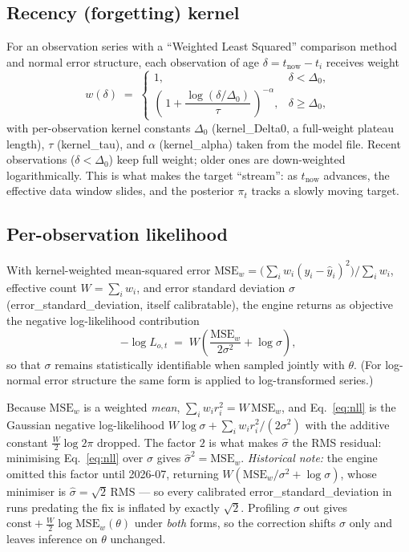 \documentclass[11pt]{article}
\newcommand{\param}[1]{\textsf{#1}}
\begin{document}
\subsection{Recency (forgetting) kernel}
For an observation series with a ``Weighted Least Squared'' comparison
method and normal error structure, each observation of age
$\delta = t_{\text{now}} - t_i$ receives weight
\begin{equation}
  w(\delta) \;=\;
  \begin{cases}
    1, & \delta < \Delta_0,\\[4pt]
    \left(\,1 + \dfrac{\log(\delta/\Delta_0)}{\tau}\,\right)^{-\alpha},
      & \delta \ge \Delta_0,
  \end{cases}
  \label{eq:kernel}
\end{equation}
with per-observation kernel constants $\Delta_0$
(\param{kernel\_Delta0}, a full-weight plateau length), $\tau$
(\param{kernel\_tau}), and $\alpha$ (\param{kernel\_alpha}) taken from
the model file. Recent observations ($\delta<\Delta_0$) keep full
weight; older ones are down-weighted logarithmically. This is what makes
the target ``stream'': as $t_{\text{now}}$ advances, the effective data
window slides, and the posterior $\pi_t$ tracks a slowly moving target.

\subsection{Per-observation likelihood}
With kernel-weighted mean-squared error
$\mathrm{MSE}_w = \big(\sum_i w_i (y_i-\hat y_i)^2\big)/\sum_i w_i$,
effective count $W=\sum_i w_i$, and error standard deviation $\sigma$
(\param{error\_standard\_deviation}, itself calibratable), the engine
returns as objective the negative log-likelihood contribution
\begin{equation}
  -\log L_{o,t} \;=\; W\!\left(\frac{\mathrm{MSE}_w}{2\sigma^2}
  + \log\sigma\right),
  \label{eq:nll}
\end{equation}
so that $\sigma$ remains statistically identifiable when sampled jointly
with $\theta$. (For log-normal error structure the same form is applied
to log-transformed series.)

Because $\mathrm{MSE}_w$ is a weighted \emph{mean}, $\sum_i w_i r_i^2 = W\,
\mathrm{MSE}_w$, and Eq.~\eqref{eq:nll} is the Gaussian negative
log-likelihood $W\log\sigma + \sum_i w_i r_i^2/(2\sigma^2)$ with the
additive constant $\tfrac{W}{2}\log 2\pi$ dropped. The factor $2$ is what
makes $\hat\sigma$ the RMS residual: minimising Eq.~\eqref{eq:nll} over
$\sigma$ gives $\hat\sigma^2 = \mathrm{MSE}_w$. \emph{Historical note:} the
engine omitted this factor until 2026-07, returning
$W(\mathrm{MSE}_w/\sigma^2 + \log\sigma)$, whose minimiser is
$\hat\sigma = \sqrt2\,\mathrm{RMS}$ --- so every calibrated
\param{error\_standard\_deviation} in runs predating the fix is inflated by
exactly $\sqrt2$. Profiling $\sigma$ out gives
$\text{const} + \tfrac{W}{2}\log \mathrm{MSE}_w(\theta)$ under \emph{both}
forms, so the correction shifts $\sigma$ only and leaves inference on
$\theta$ unchanged.
\end{document}
